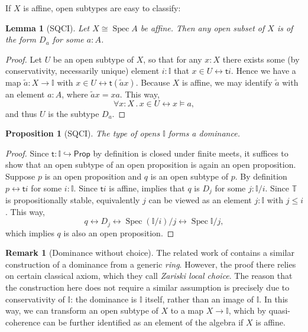 \documentclass[a4paper,12pt]{amsart}
\newtheorem{lemma}[theorem]{Lemma}
\newtheorem{proposition}[theorem]{Proposition}
\theoremstyle{definition}
\newtheorem{remark}[theorem]{Remark}
\newcommand{\mbb}[1]{\mathbb{#1}}
\newcommand{\T}{\mbb T}
\newcommand{\I}{\mbb I}
\newcommand{\ms}[1]{\mathsf{#1}}
\newcommand{\qsi}[1]{\tilde{#1}}
\newcommand{\hook}{\hookrightarrow}
\newcommand{\fa}[2]{\forall #1\!\colon\!\!#2\mathpunct{.}}
\newcommand{\eq}{\leftrightarrow}
\newcommand{\pp}{\ms{Prop}}
\newcommand{\spec}{\operatorname{Spec}}
\begin{document}
If $X$ is affine, open subtypes are easy to classify:

\begin{lemma}[SQCI]\label{lem:openofaffinegivesalgebra}
  Let $X \cong \spec A$ be affine. Then any open subset of $X$ is of the form $D_a$ for some $a:A$.
\end{lemma}
\begin{proof}
  Let $U$ be an open subtype of $X$, so that for any $x:X$ there exists some (by conservativity, necessarily unique) element $i:\I$ that $x \in U \eq \ms ti$.
  Hence we have a map $\qsi a \colon X \to \I$ with $x \in U \eq \ms t(\qsi ax)$. Because $X$ is affine, we may identify $\qsi a$ with an element $a:A$, where $\qsi ax = xa$. This way,
  \[ \fa xX x \in U \eq x \models a, \]
  and thus $U$ is the subtype $D_a$.
\end{proof}

\begin{proposition}[SQCI]\label{prop:Idominance}
  The type of opens $\I$ forms a dominance.
\end{proposition}
\begin{proof}
  Since $\ms t \colon \I \hook \pp$ by definition is closed under finite meets, it suffices to show that an open subtype of an open proposition is again an open proposition. Suppose $p$ is an open proposition and $q$ is an open subtype of $p$. By definition $p \eq \ms ti$ for some $i:\I$. Since $\ms ti$ is affine,  implies that $q$ is $D_j$ for some $j : \I/i$. Since $\T$ is propositionally stable, equivalently $j$ can be viewed as an element $j : \I$ with $j \le i$. This way, 
  \[ q \eq D_j \eq \spec(\I/i)/j \eq \spec\I/j, \]
  which implies $q$ is also an open proposition.
\end{proof}

\begin{remark}[Dominance without choice]\label{rem:dominancewithoutchoice}
  The related work of \citet{Cherubini_Coquand_Hutzler_2024} contains a similar construction of a dominance from a generic \emph{ring}. However, the proof there relies on certain classical axiom, which they call \emph{Zariski local choice}. The reason that the construction here does not require a similar assumption is precisely due to conservativity of $\I$: the dominance is $\I$ itself, rather than an image of $\I$. In this way, we can transform an open subtype of $X$ to a map $X \to \I$, which by quasi-coherence can be further identified as an element of the algebra if $X$ is affine. 
\end{remark}
\end{document}
